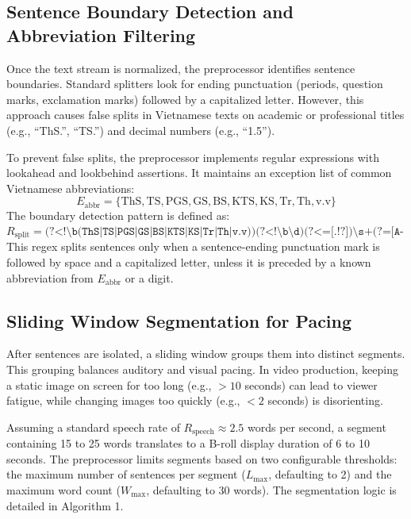 \documentclass[a4paper,12pt]{report}
\begin{document}
\subsection{Sentence Boundary Detection and Abbreviation Filtering}
Once the text stream is normalized, the preprocessor identifies sentence boundaries. Standard splitters look for ending punctuation (periods, question marks, exclamation marks) followed by a capitalized letter. However, this approach causes false splits in Vietnamese texts on academic or professional titles (e.g., ``ThS.'', ``TS.'') and decimal numbers (e.g., ``1.5'').

To prevent false splits, the preprocessor implements regular expressions with lookahead and lookbehind assertions. It maintains an exception list of common Vietnamese abbreviations:
\begin{equation}
    E_{\text{abbr}} = \{\text{ThS}, \text{TS}, \text{PGS}, \text{GS}, \text{BS}, \text{KTS}, \text{KS}, \text{Tr}, \text{Th}, \text{v.v}\}
\end{equation}
The boundary detection pattern is defined as:
\begin{equation}
    R_{\text{split}} = \texttt{(?<!\textbackslash b(ThS|TS|PGS|GS|BS|KTS|KS|Tr|Th|v.v))(?<!\textbackslash b\textbackslash d)(?<=[.!?])\textbackslash s+(?=[A-ZÀÁÂÃÈÉÊÌÍÒÓÔÕÙÚÝĂĐĨŨƠƯ])}
\end{equation}
This regex splits sentences only when a sentence-ending punctuation mark is followed by space and a capitalized letter, unless it is preceded by a known abbreviation from $E_{\text{abbr}}$ or a digit.

\subsection{Sliding Window Segmentation for Pacing}
After sentences are isolated, a sliding window groups them into distinct segments. This grouping balances auditory and visual pacing. In video production, keeping a static image on screen for too long (e.g., $>10$ seconds) can lead to viewer fatigue, while changing images too quickly (e.g., $<2$ seconds) is disorienting.

Assuming a standard speech rate of $R_{\text{speech}} \approx 2.5$ words per second, a segment containing 15 to 25 words translates to a B-roll display duration of 6 to 10 seconds. The preprocessor limits segments based on two configurable thresholds: the maximum number of sentences per segment ($L_{\text{max}}$, defaulting to 2) and the maximum word count ($W_{\text{max}}$, defaulting to 30 words). The segmentation logic is detailed in Algorithm 1.
\end{document}
